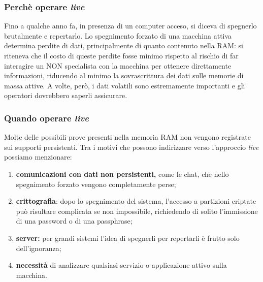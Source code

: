 \documentclass[11pt]{beamer}
\begin{document}
	\begin{frame}
		\frametitle{Perchè operare \textit{live}}
		Fino a qualche anno fa, in presenza di un computer acceso, si diceva di spegnerlo brutalmente e repertarlo.
		\vfill
		Lo spegnimento forzato di una macchina attiva determina perdite di dati, principalmente di quanto contenuto nella RAM: si riteneva che il costo di queste perdite fosse minimo rispetto al rischio di far interagire un NON specialista con la macchina per ottenere direttamente informazioni, riducendo al minimo la sovrascrittura dei dati sulle memorie di massa attive.
		\vfill
		A volte, però, i dati volatili sono estremamente importanti e gli operatori dovrebbero saperli assicurare.
	\end{frame}
	
	\begin{frame}
		\frametitle{Quando operare \textit{live}}
			Molte delle possibili prove presenti nella memoria RAM non vengono registrate sui supporti persistenti. Tra i motivi che possono indirizzare verso l'approccio \textit{live} possiamo menzionare:
			
			\begin{enumerate}
				
				\item{\textbf{comunicazioni con dati non persistenti,}} come le chat, che nello spegnimento forzato vengono completamente perse;
				\item{\textbf{crittografia}}: dopo lo spegnimento del sistema, l'accesso a partizioni criptate può risultare complicata se non impossibile, richiedendo di solito l'immissione di una password o di una passphrase;
				\item{\textbf{server:}} per grandi sistemi l'idea di spegnerli per repertarli è frutto solo dell'ignoranza;
				\item{\textbf{necessità}} di analizzare qualsiasi servizio o applicazione attivo sulla macchina.
			\end{enumerate}
	\end{frame}
	
\end{document}
